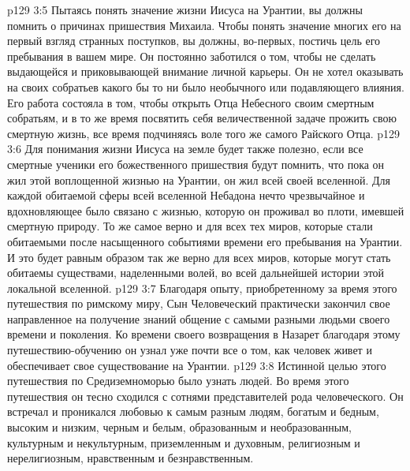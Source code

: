 \vs p129 3:5 \pc Пытаясь понять значение жизни Иисуса на Урантии, вы должны помнить о причинах пришествия Михаила. Чтобы понять значение многих его на первый взгляд странных поступков, вы должны, во\hyp{}первых, постичь цель его пребывания в вашем мире. Он постоянно заботился о том, чтобы не сделать выдающейся и приковывающей внимание личной карьеры. Он не хотел оказывать на своих собратьев какого бы то ни было необычного или подавляющего влияния. Его работа состояла в том, чтобы открыть Отца Небесного своим смертным собратьям, и в то же время посвятить себя величественной задаче прожить свою смертную жизнь, все время подчиняясь воле того же самого Райского Отца.
\vs p129 3:6 \pc Для понимания жизни Иисуса на земле будет также полезно, если все смертные ученики его божественного пришествия будут помнить, что пока он жил этой воплощенной жизнью на Урантии, он жил  всей своей вселенной. Для каждой обитаемой сферы всей вселенной Небадона нечто чрезвычайное и вдохновляющее было связано с жизнью, которую он проживал во плоти, имевшей смертную природу. То же самое верно и для всех тех миров, которые стали обитаемыми после насыщенного событиями времени его пребывания на Урантии. И это будет равным образом так же верно для всех миров, которые могут стать обитаемы существами, наделенными волей, во всей дальнейшей истории этой локальной вселенной.
\vs p129 3:7 \pc Благодаря опыту, приобретенному за время этого путешествия по римскому миру, Сын Человеческий практически закончил свое направленное на получение знаний общение с самыми разными людьми своего времени и поколения. Ко времени своего возвращения в Назарет благодаря этому путешествию\hyp{}обучению он узнал уже почти все о том, как человек живет и обеспечивает свое существование на Урантии.
\vs p129 3:8 Истинной целью этого путешествия по Средиземноморью было узнать людей. Во время этого путешествия он тесно сходился с сотнями представителей рода человеческого. Он встречал и проникался любовью к самым разным людям, богатым и бедным, высоким и низким, черным и белым, образованным и необразованным, культурным и некультурным, приземленным и духовным, религиозным и нерелигиозным, нравственным и безнравственным.
